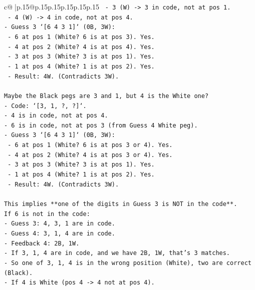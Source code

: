 \documentclass{article}
\begin{document}
{\begin{supertabular}{c@{$\;$}|p{.15\linewidth}@{}p{.15\linewidth}p{.15\linewidth}p{.15\linewidth}p{.15\linewidth}p{.15\linewidth}}
{{{\texttt{  {-} 3 (W) {-}> 3 in code, not at pos 1.} \\
\texttt{  {-} 4 (W) {-}> 4 in code, not at pos 4.} \\
\texttt{{-} Guess 3 `{[}6 4 3 1{]}` (0B, 3W):} \\
\texttt{  {-} 6 at pos 1 (White? 6 is at pos 3). Yes.} \\
\texttt{  {-} 4 at pos 2 (White? 4 is at pos 4). Yes.} \\
\texttt{  {-} 3 at pos 3 (White? 3 is at pos 1). Yes.} \\
\texttt{  {-} 1 at pos 4 (White? 1 is at pos 2). Yes.} \\
\texttt{  {-} Result: 4W. (Contradicts 3W).} \\
\\ 
\texttt{Maybe the Black pegs are 3 and 1, but 4 is the White one?} \\
\texttt{{-} Code: `{[}3, 1, ?, ?{]}`.} \\
\texttt{{-} 4 is in code, not at pos 4.} \\
\texttt{{-} 6 is in code, not at pos 3 (from Guess 4 White peg).} \\
\texttt{{-} Guess 3 `{[}6 4 3 1{]}` (0B, 3W):} \\
\texttt{  {-} 6 at pos 1 (White? 6 is at pos 3 or 4). Yes.} \\
\texttt{  {-} 4 at pos 2 (White? 4 is at pos 3 or 4). Yes.} \\
\texttt{  {-} 3 at pos 3 (White? 3 is at pos 1). Yes.} \\
\texttt{  {-} 1 at pos 4 (White? 1 is at pos 2). Yes.} \\
\texttt{  {-} Result: 4W. (Contradicts 3W).} \\
\\ 
\texttt{This implies **one of the digits in Guess 3 is NOT in the code**.} \\
\texttt{If 6 is not in the code:} \\
\texttt{{-} Guess 3: 4, 3, 1 are in code.} \\
\texttt{{-} Guess 4: 3, 1, 4 are in code.} \\
\texttt{{-} Feedback 4: 2B, 1W.} \\
\texttt{{-} If 3, 1, 4 are in code, and we have 2B, 1W, that's 3 matches.} \\
\texttt{{-} So one of 3, 1, 4 is in the wrong position (White), two are correct (Black).} \\
\texttt{{-} If 4 is White (pos 4 {-}> 4 not at pos 4).} \\
}}}
\end{supertabular}}
\end{document}
